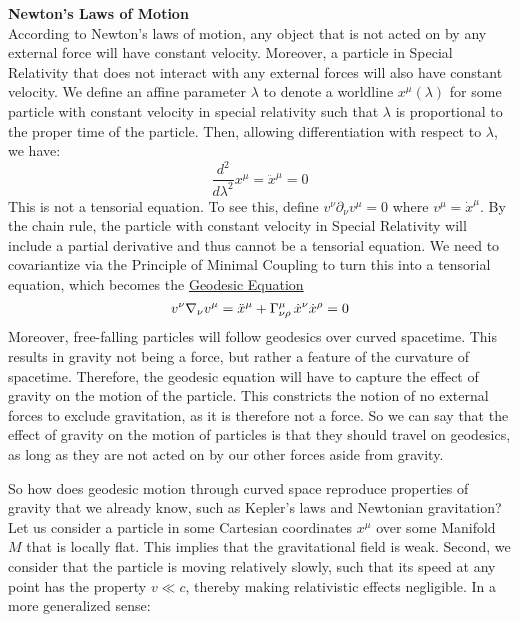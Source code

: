 \documentclass{article}
\begin{document}
 		\begin{exmp}
 			\textbf{Newton's Laws of Motion}\\
 			According to Newton's laws of motion, any object that is not acted on by any external force will have constant velocity. Moreover, a particle in Special Relativity that does not interact with any external forces will also have constant velocity. We define an affine parameter $\lambda$ to denote a worldline $x^\mu (\lambda)$ for some particle with constant velocity in special relativity such that $\lambda$ is proportional to the proper time of the particle. Then, allowing differentiation with respect to $\lambda$, we have:
 			\begin{equation}
 				\label{eq:Newton1}
 				\frac{d^2}{d\lambda^2} x^\mu = \ddot{x}^\mu = 0
 			\end{equation}
 			This is not a tensorial equation. To see this, define $v^\nu \partial_\nu v^\mu = 0$ where $v^\mu = \dot{x}^\mu$. By the chain rule, the particle with constant velocity in Special Relativity will include a partial derivative and thus cannot be a tensorial equation. We need to covariantize via the Principle of Minimal Coupling to turn this into a tensorial equation, which becomes the \hyperref[eq:GeodesicEquation]{Geodesic Equation}
 			\begin{equation}
 				\label{eq:Newton2}
 				v^\nu \nabla_\nu v^\mu = \ddot{x}^\mu + \Gamma_{\nu\rho}^\mu \,\dot{x}^\nu \dot{x}^\rho = 0
 			\end{equation}
 			Moreover, free-falling particles will follow geodesics over curved spacetime. This results in gravity not being a force, but rather a feature of the curvature of spacetime. Therefore, the geodesic equation will have to capture the effect of gravity on the motion of the particle. This constricts the notion of no external forces to exclude gravitation, as it is therefore not a force. So we can say that the effect of gravity on the motion of particles is that they should travel on geodesics, as long as they are not acted on by our other forces aside from gravity.
 		\end{exmp}
 		So how does geodesic motion through curved space reproduce properties of gravity that we already know, such as Kepler's laws and Newtonian gravitation? Let us consider a particle in some Cartesian coordinates $x^\mu$ over some Manifold $M$ that is locally flat. This implies that the gravitational field is weak. Second, we consider that the particle is moving relatively slowly, such that its speed at any point has the property $v \ll c$, thereby making relativistic effects negligible. In a more generalized sense:
\end{document}
